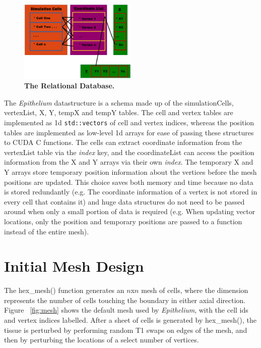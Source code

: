 \begin{figure}[h]
\centering
\includegraphics[width=0.5\textwidth]{../diagrams/ds.png}
\caption{\textbf{The Relational Database.}}
\end{figure}

The \emph{Epithelium} datastructure is a schema made up of the simulationCells, vertexList, X, Y, tempX and tempY tables. The cell and vertex tables are implemented as 1d \texttt{std::vectors} of cell and vertex indices, whereas the position tables are implemented as low-level 1d arrays for ease of passing these structures to CUDA C functions. The cells can extract coordinate information from the vertexList table via the \emph{index} key, and the coordinateList can access the position information from the X and Y arrays via their own \emph{index}. The temporary X and Y arrays store temporary position information about the vertices before the mesh positions are updated. This choice saves both memory and time because no data is stored redundantly (e.g. The coordinate information of a vertex is not stored in every cell that contains it) and huge data structures do not need to be passed around when only a small portion of data is required (e.g. When updating vector locations, only the position and temporary positions are passed to a function instead of the entire mesh). 

\section{Initial Mesh Design}
The hex\_mesh() function generates an $n$x$n$ mesh of cells, where the 
dimension represents the number of cells touching the boundary in 
either axial direction. Figure ~\ref{fig:mesh} shows the default mesh 
used by \emph{Epithelium}, with the cell ids and vertex indices labelled. After a sheet of cells is generated by 
hex\_mesh(), the tissue is perturbed by performing random 
T1 swaps on edges of the mesh, and then by perturbing the locations of a select 
number of vertices.

